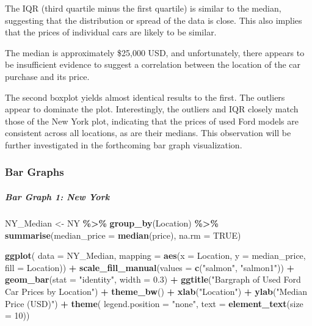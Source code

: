 \documentclass[
]{article}
\newenvironment{Shaded}{\begin{snugshade}}{\end{snugshade}}
\newcommand{\AttributeTok}[1]{\textcolor[rgb]{0.13,0.29,0.53}{#1}}
\newcommand{\ConstantTok}[1]{\textcolor[rgb]{0.56,0.35,0.01}{#1}}
\newcommand{\DecValTok}[1]{\textcolor[rgb]{0.00,0.00,0.81}{#1}}
\newcommand{\FloatTok}[1]{\textcolor[rgb]{0.00,0.00,0.81}{#1}}
\newcommand{\FunctionTok}[1]{\textcolor[rgb]{0.13,0.29,0.53}{\textbf{#1}}}
\newcommand{\NormalTok}[1]{#1}
\newcommand{\OtherTok}[1]{\textcolor[rgb]{0.56,0.35,0.01}{#1}}
\newcommand{\SpecialCharTok}[1]{\textcolor[rgb]{0.81,0.36,0.00}{\textbf{#1}}}
\newcommand{\StringTok}[1]{\textcolor[rgb]{0.31,0.60,0.02}{#1}}
\begin{document}
The IQR (third quartile minus the first quartile) is similar to the
median, suggesting that the distribution or spread of the data is close.
This also implies that the prices of individual cars are likely to be
similar.

The median is approximately \$25,000 USD, and unfortunately, there
appears to be insufficient evidence to suggest a correlation between the
location of the car purchase and its price.

The second boxplot yields almost identical results to the first. The
outliers appear to dominate the plot. Interestingly, the outliers and
IQR closely match those of the New York plot, indicating that the prices
of used Ford models are consistent across all locations, as are their
medians. This observation will be further investigated in the
forthcoming bar graph visualization.

\hypertarget{bar-graphs}{%
\subsubsection{\texorpdfstring{\textbf{Bar
Graphs}}{Bar Graphs}}\label{bar-graphs}}

\hypertarget{bar-graph-1-new-york}{%
\subparagraph{Bar Graph 1: New York}\label{bar-graph-1-new-york}}

\begin{Shaded}
\begin{Highlighting}[]
\NormalTok{NY\_Median }\OtherTok{\textless{}{-}} 
\NormalTok{  NY }\SpecialCharTok{\%\textgreater{}\%}
  \FunctionTok{group\_by}\NormalTok{(Location) }\SpecialCharTok{\%\textgreater{}\%}
  \FunctionTok{summarise}\NormalTok{(}\AttributeTok{median\_price =} \FunctionTok{median}\NormalTok{(price), }\AttributeTok{na.rm =} \ConstantTok{TRUE}\NormalTok{)}

\FunctionTok{ggplot}\NormalTok{(}
\AttributeTok{data =}\NormalTok{ NY\_Median,}
\AttributeTok{mapping =} \FunctionTok{aes}\NormalTok{(}\AttributeTok{x =}\NormalTok{ Location, }\AttributeTok{y =}\NormalTok{ median\_price, }\AttributeTok{fill =}\NormalTok{ Location)) }\SpecialCharTok{+}
  \FunctionTok{scale\_fill\_manual}\NormalTok{(}\AttributeTok{values =} \FunctionTok{c}\NormalTok{(}\StringTok{"salmon"}\NormalTok{, }\StringTok{"salmon1"}\NormalTok{)) }\SpecialCharTok{+}
  \FunctionTok{geom\_bar}\NormalTok{(}\AttributeTok{stat =} \StringTok{"identity"}\NormalTok{, }\AttributeTok{width =} \FloatTok{0.3}\NormalTok{) }\SpecialCharTok{+}
  \FunctionTok{ggtitle}\NormalTok{(}\StringTok{"Bargraph of Used Ford Car Prices by Location"}\NormalTok{) }\SpecialCharTok{+}
  \FunctionTok{theme\_bw}\NormalTok{() }\SpecialCharTok{+}
  \FunctionTok{xlab}\NormalTok{(}\StringTok{"Location"}\NormalTok{) }\SpecialCharTok{+}
  \FunctionTok{ylab}\NormalTok{(}\StringTok{"Median Price (USD)"}\NormalTok{) }\SpecialCharTok{+}
  \FunctionTok{theme}\NormalTok{(}
  \AttributeTok{legend.position =} \StringTok{"none"}\NormalTok{,}
  \AttributeTok{text =} \FunctionTok{element\_text}\NormalTok{(}\AttributeTok{size =} \DecValTok{10}\NormalTok{))}
\end{Highlighting}
\end{Shaded}
\end{document}
